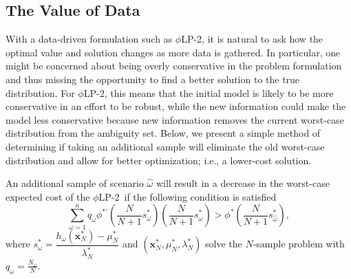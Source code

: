 \documentclass[opre,nonblindrev]{informs3} %
\newcommand{\x}{\mathbf{x}}
\newcommand{\plp}{$\phi$LP-2}
\begin{document}
\subsection{The Value of Data} \label{ssec:value}

With a data-driven formulation such as \plp, it is natural to ask how the optimal value and solution changes as more data is gathered.
In particular, %
one might be concerned about being overly conservative in the problem formulation and thus missing the opportunity to find a better solution to the true distribution.
For \plp, this means that the initial model is likely to be more conservative in an effort to be robust, while the new information could make the model less conservative because new information removes the current worst-case distribution from the ambiguity set.  
Below, we present a simple method of determining if taking an additional sample will eliminate the old worst-case distribution and allow for better optimization; i.e., a lower-cost solution.

\begin{theorem}
	\label{thm:value}
	An additional sample of scenario $\hat{\omega}$ will result in a decrease in the worst-case expected cost of the \plp\ if the following condition is satisfied
	\begin{equation} \label{eq:cost_decrease_cond}
		\sum_{\omega=1}^n q_\omega \phi^{*\prime}\left(\frac{N}{N+1}s^*_\omega\right) \left(\frac{N}{N+1}s^*_\omega\right) > \phi^*\left(\frac{N}{N+1}s^*_{\hat{\omega}}\right),
	\end{equation}
	where $s^*_\omega = \dfrac{h_\omega(\x^*_N) - \mu^*_N}{\lambda^*_N}$ and $(\x^*_N,\mu^*_N,\lambda^*_N)$ solve the $N$-sample problem with $q_\omega = \tfrac{N_\omega}{N}$.
\end{theorem}
\end{document}
